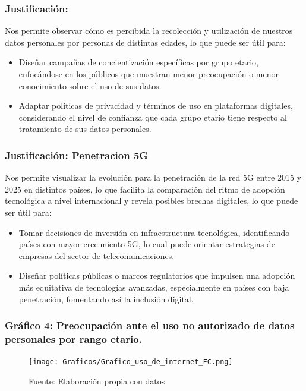 \documentclass[12pt, a4paper]{article}
\begin{document}
\subsubsection*{Justificación:}
Nos permite observar cómo es percibida la recolección y utilización de nuestros datos personales por personas de distintas edades, lo que puede ser útil para:

\begin{itemize}
    \item Diseñar campañas de concientización específicas por grupo etario, enfocándose en los públicos que muestran menor preocupación o menor conocimiento sobre el uso de sus datos.
    \item Adaptar políticas de privacidad y términos de uso en plataformas digitales, considerando el nivel de confianza que cada grupo etario tiene respecto al tratamiento de sus datos personales.
\end{itemize}

\subsubsection*{Justificación: Penetracion 5G}
Nos permite visualizar la evolución para la penetración de la red 5G entre 2015 y 2025 en distintos países, lo que facilita la comparación del ritmo de adopción tecnológica a nivel internacional y revela posibles brechas digitales, lo que puede ser útil para:
\begin{itemize}
    \item Tomar decisiones de inversión en infraestructura tecnológica, identificando países con mayor crecimiento 5G, lo cual puede orientar estrategias de empresas del sector de telecomunicaciones.
    \item Diseñar políticas públicas o marcos regulatorios que impulsen una adopción más equitativa de tecnologías avanzadas, especialmente en países con baja penetración, fomentando así la inclusión digital.
\end{itemize}

\subsubsection*{Gráfico 4: Preocupación ante el uso no autorizado de datos personales por rango etario.}
\begin{figure}[H]
    \centering
    \texttt{[image: Graficos/Grafico\_uso\_de\_internet\_FC.png]}
    \caption[5]{Fuente: Elaboración propia con datos}
\end{figure}
\end{document}
